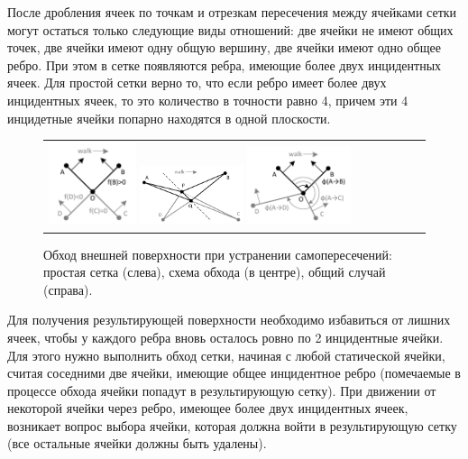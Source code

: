 После дробления ячеек по точкам и отрезкам пересечения между ячейками сетки могут остаться только следующие виды отношений: две ячейки не имеют общих точек, две ячейки имеют одну общую вершину, две ячейки имеют одно общее ребро.
При этом в сетке появляются ребра, имеющие более двух инцидентных ячеек.
Для простой сетки верно то, что если ребро имеет более двух инцидентных ячеек, то это количество в точности равно 4, причем эти 4 инцидетные ячейки попарно находятся в одной плоскости.

\begin{figure}[ht]
\centering
\begin{tabular}{lll}
\includegraphics[width=0.25\textwidth]{fig/int_walk_simple.pdf}
\includegraphics[width=0.3\textwidth]{fig/int_walk_centre.pdf}
\includegraphics[width=0.3\textwidth]{fig/int_walk_not_simple.pdf}
\end{tabular}
\singlespacing
\caption{Обход внешней поверхности при устранении самопересечений: простая сетка (слева), схема обхода (в центре), общий случай (справа).}
\label{fig:int_walk}
\end{figure}

Для получения результирующей поверхности необходимо избавиться от лишних ячеек, чтобы у каждого ребра вновь осталось ровно по 2 инцидентные ячейки.
Для этого нужно выполнить обход сетки, начиная с любой статической ячейки, считая соседними две ячейки, имеющие общее инцидентное ребро (помечаемые в процессе обхода ячейки попадут в результирующую сетку).
При движении от некоторой ячейки через ребро, имеющее более двух инцидентных ячеек, возникает вопрос выбора ячейки, которая должна войти в результирующую сетку (все остальные ячейки должны быть удалены).

